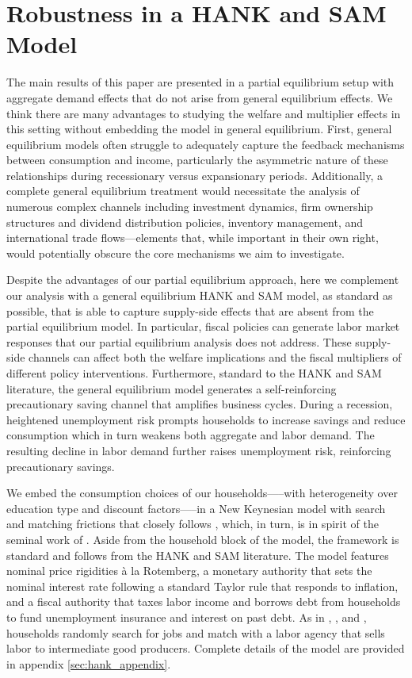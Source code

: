 \documentclass[\econtexRoot/HAFiscal]{subfiles}
\begin{document}
	
\FloatBarrier
\hypertarget{hank}{}\par\section{Robustness in a HANK and SAM Model}
\notinsubfile{\label{sec:hank}}


The main results of this paper are presented in a partial equilibrium setup with aggregate demand effects that do not arise from general equilibrium effects. We think there are many advantages to studying the welfare and multiplier effects in this setting without embedding the model in general equilibrium.  First, general equilibrium models often struggle to adequately capture the feedback mechanisms between consumption and income, particularly the asymmetric nature of these relationships during recessionary versus expansionary periods. Additionally, a complete general equilibrium treatment would necessitate the analysis of numerous complex channels including investment dynamics, firm ownership structures and dividend distribution policies, inventory management, and international trade flows—elements that, while important in their own right, would potentially obscure the core mechanisms we aim to investigate.

Despite the advantages of our partial equilibrium approach, here we complement our analysis with a general equilibrium HANK and SAM model, as standard as possible, that is able to capture supply-side effects that are absent from the partial equilibrium model. In particular, fiscal policies can generate labor market responses that our partial equilibrium analysis does not address. These supply-side channels can affect both the welfare implications and the fiscal multipliers of different policy interventions. Furthermore, standard to the HANK and SAM literature, the general equilibrium model generates a self-reinforcing precautionary saving channel that amplifies business cycles. During a recession, heightened unemployment risk prompts households to increase savings and reduce consumption which in turn weakens both aggregate and labor demand. The resulting decline in labor demand further raises unemployment risk, reinforcing precautionary savings.

We embed the consumption choices of our households—--with heterogeneity over education type and discount factors—--in a New Keynesian model with search and matching frictions that closely follows \cite{Du2024}, which, in turn, is in spirit of the seminal work of \cite{Ravn2017,Ravn2021}. Aside from the household block of the model, the framework is standard and follows from the HANK and SAM literature. The model features nominal price rigidities \`{a} la Rotemberg, a monetary authority that sets the nominal interest rate following a standard Taylor rule that responds to inflation, and a fiscal authority that taxes labor income and borrows debt from households to fund unemployment insurance and interest on past debt. As in \cite{Gornemann2021}, \cite{Bardoczy2022}, and \cite{gravesUnemployment}, households randomly search for jobs and match with a labor agency that sells labor to intermediate good producers. Complete details of the model are provided in appendix \ref{sec:hank_appendix}. 
\end{document}
